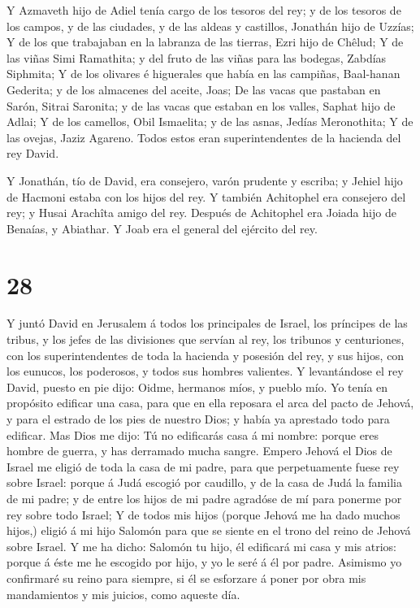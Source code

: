  Y Azmaveth hijo de Adiel tenía cargo de los tesoros del
rey; y de los tesoros de los campos, y de las ciudades, y de las aldeas
y castillos, Jonathán hijo de Uzzías;  Y de los que
trabajaban en la labranza de las tierras, Ezri hijo de Chêlud;
 Y de las viñas Simi Ramathita; y del fruto de las viñas
para las bodegas, Zabdías Siphmita;  Y de los olivares é
higuerales que había en las campiñas, Baal-hanan Gederita; y de los
almacenes del aceite, Joas;  De las vacas que pastaban en
Sarón, Sitrai Saronita; y de las vacas que estaban en los valles, Saphat
hijo de Adlai;  Y de los camellos, Obil Ismaelita; y de las
asnas, Jedías Meronothita;  Y de las ovejas, Jaziz Agareno.
Todos estos eran superintendentes de la hacienda del rey David.

 Y Jonathán, tío de David, era consejero, varón prudente y
escriba; y Jehiel hijo de Hacmoni estaba con los hijos del rey.
 Y también Achitophel era consejero del rey; y Husai
Arachîta amigo del rey.  Después de Achitophel era Joiada
hijo de Benaías, y Abiathar. Y Joab era el general del ejército del rey.

\hypertarget{section-27}{%
\section{28}\label{section-27}}

 Y juntó David en Jerusalem á todos los principales de
Israel, los príncipes de las tribus, y los jefes de las divisiones que
servían al rey, los tribunos y centuriones, con los superintendentes de
toda la hacienda y posesión del rey, y sus hijos, con los eunucos, los
poderosos, y todos sus hombres valientes.  Y levantándose el
rey David, puesto en pie dijo: Oidme, hermanos míos, y pueblo mío. Yo
tenía en propósito edificar una casa, para que en ella reposara el arca
del pacto de Jehová, y para el estrado de los pies de nuestro Dios; y
había ya aprestado todo para edificar.  Mas Dios me dijo: Tú
no edificarás casa á mi nombre: porque eres hombre de guerra, y has
derramado mucha sangre.  Empero Jehová el Dios de Israel me
eligió de toda la casa de mi padre, para que perpetuamente fuese rey
sobre Israel: porque á Judá escogió por caudillo, y de la casa de Judá
la familia de mi padre; y de entre los hijos de mi padre agradóse de mí
para ponerme por rey sobre todo Israel;  Y de todos mis
hijos (porque Jehová me ha dado muchos hijos,) eligió á mi hijo Salomón
para que se siente en el trono del reino de Jehová sobre Israel.
 Y me ha dicho: Salomón tu hijo, él edificará mi casa y mis
atrios: porque á éste me he escogido por hijo, y yo le seré á él por
padre.  Asimismo yo confirmaré su reino para siempre, si él
se esforzare á poner por obra mis mandamientos y mis juicios, como
aqueste día.

